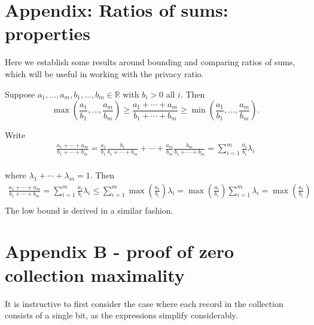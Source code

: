 \documentclass[11pt]{article}
\newcommand{\R}{\mathbb{R}}
\begin{document}
\section{Appendix: Ratios of sums: properties}

Here we establish some results around bounding and comparing ratios of sums, which will be useful in working with the privacy ratio.  

\begin{lem} \label{lem:rsbound}
Suppose $a_1,\dots,a_m,b_1,\dots,b_m \in \R$ with $b_i > 0$ all $i$.
Then 
\[ \max\left(\frac{a_1}{b_1},\dots,\frac{a_m}{b_m}\right) \geq  \frac{a_1 + \cdots + a_m}{b_1 + \cdots + b_m} \geq \min \left(\frac{a_1}{b_1},\dots,\frac{a_m}{b_m}\right). \]
\end{lem}
\begin{pf}
Write
 \begin{align*}
  \frac{a_1 + \cdots + a_m}{b_1 + \cdots + b_m}
= \frac{a_1}{b_1}\frac{b_1}{b_1+\cdots+b_m} +
\cdots + \frac{a_m}{b_m}\frac{b_m}{b_1+\cdots+b_m} = \sum_{i=1}^m \frac{a_i}{b_i} \lambda_i  \\ 
\end{align*}

where $\lambda_1 + \cdots + \lambda_m = 1$.  Then
 \begin{align*}
  \frac{a_1 + \cdots + a_m}{b_1 + \cdots + b_m} = \sum_{i=1}^m \frac{a_i}{b_i} \lambda_i  \leq  \sum_{i=1}^m \max \left ( \frac{a_i}{b_i} \right ) \lambda_i  = \max \left ( \frac{a_i}{b_i} \right ) \sum_{i=1}^m \lambda_i = \max \left ( \frac{a_i}{b_i} \right ) \\ 
\end{align*}
The low bound is derived in a similar fashion. 
\end{pf}


\section{Appendix B - proof of zero collection maximality}

It is instructive to first consider the case where each record in the collection consists of a single bit, as the expressions simplify considerably.
\end{document}
